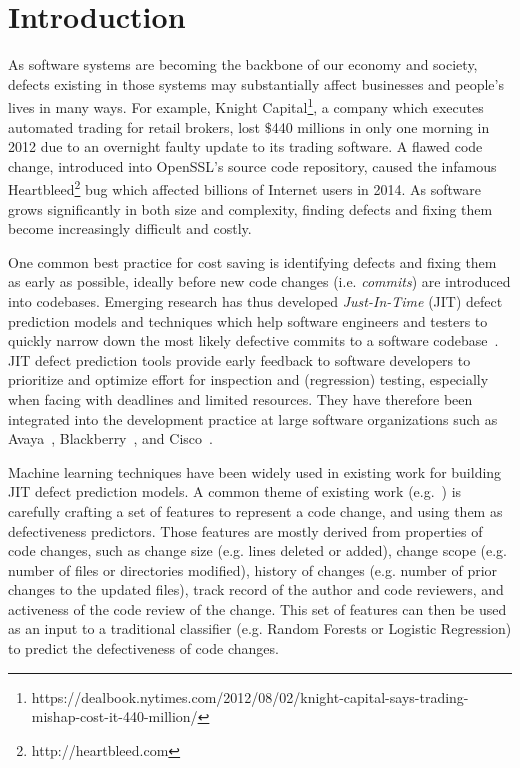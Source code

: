 \section{Introduction}
\label{sec:intro}
As software systems are becoming the backbone of our economy and society, defects existing in those systems may substantially affect businesses and people's lives  in many ways. For example, Knight Capital\footnote{https://dealbook.nytimes.com/2012/08/02/knight-capital-says-trading-mishap-cost-it-440-million/}, a company which executes automated trading  for retail brokers, lost $\$$440 millions in only one morning in 2012 due to an overnight faulty update to its trading software. A flawed code change, introduced into OpenSSL's source code repository, caused the infamous Heartbleed\footnote{http://heartbleed.com} bug which affected billions of Internet users in 2014. As software grows significantly in both size and complexity, finding defects and fixing them become increasingly difficult and costly.

One common best practice for cost saving is identifying defects and fixing them as early as possible, ideally before new code changes (i.e. \emph{commits}) are introduced into codebases. Emerging research has thus developed \emph{Just-In-Time} (JIT) defect prediction models and techniques which help software engineers and testers to quickly narrow down the most likely defective commits to a software codebase~\cite{KameiS16,D'Ambros:2012:EDP}. JIT defect prediction tools provide early feedback to software developers to prioritize and optimize effort for inspection and (regression) testing, especially when facing with deadlines and limited resources. They have therefore been integrated into the development practice at large software organizations such as Avaya~\cite{Mockus2000}, Blackberry~\cite{Shihab:2012:ISR}, and Cisco~\cite{Tantithamthavorn:2015:IMP}.

Machine learning techniques have been widely used in existing work for building JIT defect prediction models. A common theme of existing work (e.g.~\cite{Kamei:2013:LES,Kim:2008:CSC,Kononenko:2015,Mockus2000}) is carefully crafting a set of features to represent a code change, and using them as defectiveness predictors. Those features are mostly derived from properties of code changes, such as change size (e.g. lines deleted or added), change scope (e.g. number of files or directories modified), history of changes (e.g. number of prior changes to the updated files), track record of the author and code reviewers, and activeness of the code review of the change. This set of features can then be used as an input to a traditional classifier (e.g. Random Forests or Logistic Regression) to predict the defectiveness of code changes. 

